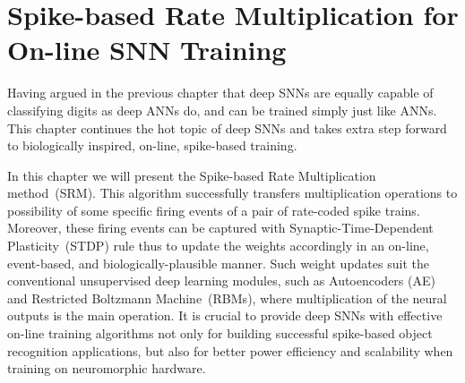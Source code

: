 \chapter{Spike-based Rate Multiplication for On-line SNN Training}
\label{cha:sdlm}
Having argued in the previous chapter that deep SNNs are equally capable of classifying digits as deep ANNs do, and can be trained simply just like ANNs.
This chapter continues the hot topic of deep SNNs and takes extra step forward to biologically inspired, on-line, spike-based training.

In this chapter we will present the Spike-based Rate Multiplication method~(SRM).
This algorithm successfully transfers multiplication operations to possibility of some specific firing events of a pair of rate-coded spike trains.
Moreover, these firing events can be captured with Synaptic-Time-Dependent Plasticity~(STDP) rule thus to update the weights accordingly in an on-line, event-based, and biologically-plausible manner.
Such weight updates suit the conventional unsupervised deep learning modules, such as Autoencoders (AE) and Restricted Boltzmann Machine~(RBMs), where multiplication of the neural outputs is the main operation.
It is crucial to provide deep SNNs with effective on-line training algorithms not only for building successful spike-based object recognition applications, but also for better power efficiency and scalability when training on neuromorphic hardware.


